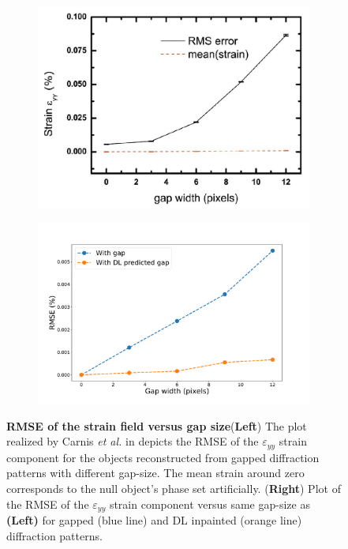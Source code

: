 \begin{figure}[H]
    \centering
    \begin{subfigure}{0.42\textwidth} 
        \includegraphics[width=\linewidth]{figures/Inpainting/Carnis_plot_paper.pdf}
        \caption*{}
    \end{subfigure}
    \hfill
    \begin{subfigure}{0.52\textwidth}
        \centering
        \includegraphics[width=\linewidth]{figures/Inpainting/std_strain_comparison.pdf}
        \caption*{}
    \end{subfigure}
    \caption{\textbf{RMSE of the strain field versus gap size}(\textbf{Left}) The plot realized by Carnis \textit{et al.} in 
    \cite{carnis_towards_2019} depicts the RMSE of the $\varepsilon_{yy}$ strain component for the objects reconstructed 
    from gapped diffraction patterns with different gap-size. The mean strain around zero corresponds to the null object's phase 
    set artificially. (\textbf{Right}) Plot of the RMSE of the $\varepsilon_{yy}$ strain component versus same gap-size 
    as \textbf{(Left)} for gapped (blue line) and DL inpainted (orange line) diffraction patterns. }
    \label{fig:Carnis_std}
\end{figure}

